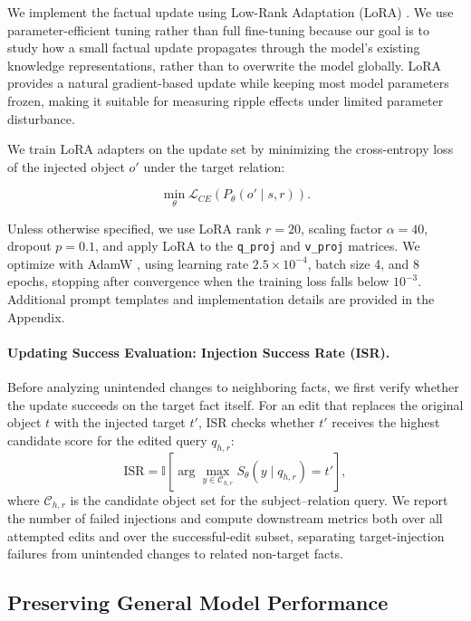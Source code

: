 We implement the factual update using Low-Rank Adaptation (LoRA) \cite{hu2021lora}. We use parameter-efficient tuning rather than full fine-tuning because our goal is to study how a small factual update propagates through the model's existing knowledge representations, rather than to overwrite the model globally. LoRA provides a natural gradient-based update while keeping most model parameters frozen, making it suitable for measuring ripple effects under limited parameter disturbance.

We train LoRA adapters on the update set by minimizing the cross-entropy loss of the injected object $o'$ under the target relation:

\[
\min_{\theta} \mathcal{L}_{CE}(P_{\theta}(o' \mid s,r)).
\]

Unless otherwise specified, we use LoRA rank $r=20$, scaling factor $\alpha=40$, dropout $p=0.1$, and apply LoRA to the \texttt{q\_proj} and \texttt{v\_proj} matrices. We optimize with AdamW \cite{loshchilov2019decoupled}, using learning rate $2.5 \times 10^{-4}$, batch size 4, and 8 epochs, stopping after convergence when the training loss falls below $10^{-3}$. Additional prompt templates and implementation details are provided in the Appendix.


\paragraph{Updating Success Evaluation: Injection Success Rate (ISR).}
Before analyzing unintended changes to neighboring facts, we first verify whether the update succeeds on the target fact itself. For an edit that replaces the original object $t$ with the injected target $t'$, ISR checks whether $t'$ receives the highest candidate score for the edited query $q_{h,r}$:
\begin{equation}
    \text{ISR}
    =
    \mathbb{I}
    \left[
    \arg\max_{y \in \mathcal{C}_{h,r}}
    S_\theta(y \mid q_{h,r})
    =
    t'
    \right],
    \label{eq:isr}
\end{equation}
where $\mathcal{C}_{h,r}$ is the candidate object set for the subject--relation query. We report the number of failed injections and compute downstream metrics both over all attempted edits and over the successful-edit subset, separating target-injection failures from unintended changes to related non-target facts.

\subsection{Preserving General Model Performance}

